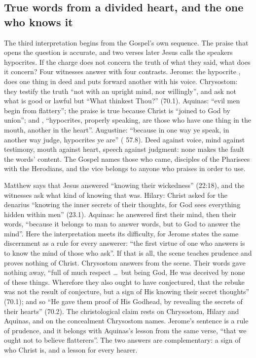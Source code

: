 \subsection{True words from a divided heart, and the one who knows it}

The third interpretation begins from the Gospel's own sequence. The praise that
opens the question is accurate, and two verses later Jesus calls the speakers
hypocrites. If the charge does not concern the truth of what they said, what
does it concern? Four witnesses answer with four contrasts. Jerome: the
hypocrite , does one thing in
deed and puts forward another with his voice. Chrysostom: they testify the
truth ``not with an upright mind, nor willingly'', and ask not what is good or
lawful but ``What thinkest Thou?'' (70.1). Aquinas: ``evil men begin from
flattery''; the praise is true because Christ is ``joined to God by union'';
and , ``hypocrites, properly speaking, are those who have one thing in the
mouth, another in the heart''. Augustine: ``because in one way ye speak, in another
way judge, hypocrites ye are'' ( 57.8). Deed
against voice, mind against testimony, mouth against heart, speech against
judgment: none makes the fault the words' content. The Gospel names those who
came, disciples of the Pharisees with the Herodians, and the vice belongs to
anyone who praises in order to use.

Matthew says that Jesus answered ``knowing their wickedness'' (22:18), and the
witnesses ask what kind of knowing that was. Hilary: Christ asked for the denarius
``knowing the inner secrets of their thoughts, for God sees everything hidden
within men'' (23.1). Aquinas: he answered first their mind, then their words, ``because it belongs
to man to answer words, but to God to answer the mind''.
Here the interpretation meets its difficulty, for Jerome states the same
discernment as a rule for every answerer: ``the first virtue of one who answers
is to know the mind of those who ask''. If that is all, the scene teaches prudence
and proves nothing of Christ. Chrysostom answers from the scene. Their words
gave nothing away, ``full of much respect \ldots\ but being God, He was
deceived by none of these things. Wherefore they also ought to have conjectured,
that the rebuke was not the result of conjecture, but a sign of His knowing
their secret thoughts'' (70.1); and so ``He gave them proof of His Godhead, by
revealing the secrets of their hearts'' (70.2). The christological claim rests
on Chrysostom, Hilary and Aquinas, and on the concealment Chrysostom names.
Jerome's sentence is a rule of prudence, and it belongs with Aquinas's lesson
from the same verse, ``that we ought not to believe flatterers''. The two
answers are complementary: a sign of who Christ is, and a lesson for every
hearer.

